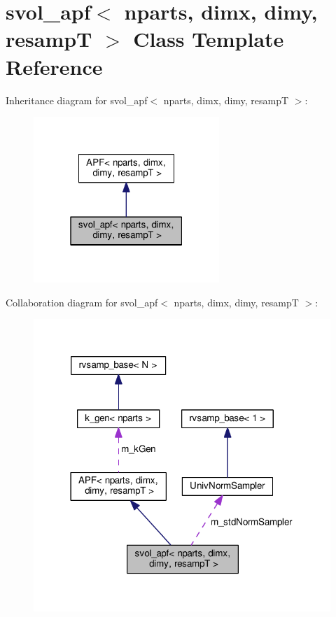 \hypertarget{classsvol__apf}{}\section{svol\+\_\+apf$<$ nparts, dimx, dimy, resampT $>$ Class Template Reference}
\label{classsvol__apf}


Inheritance diagram for svol\+\_\+apf$<$ nparts, dimx, dimy, resampT $>$\+:
\nopagebreak
\begin{figure}[H]
\begin{center}
\leavevmode
\includegraphics[width=199pt]{classsvol__apf__inherit__graph}
\end{center}
\end{figure}


Collaboration diagram for svol\+\_\+apf$<$ nparts, dimx, dimy, resampT $>$\+:
\nopagebreak
\begin{figure}[H]
\begin{center}
\leavevmode
\includegraphics[width=318pt]{classsvol__apf__coll__graph}
\end{center}
\end{figure}
